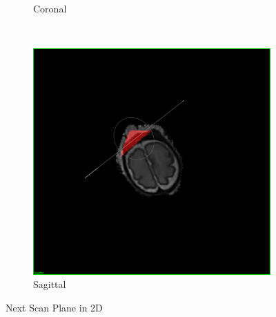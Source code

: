 \begin{figure}[H]
\begin{subfigure}[b]{0.4\textwidth}
    \caption*{Coronal}
    \label{fig:nextscanplanecoronal}
  \end{subfigure}
  ~%
  \begin{subfigure}[b]{0.4\textwidth}
    \includegraphics[width=\textwidth]{images/next_scan_plane/sagittal.png}
    \caption*{Sagittal}
    \label{fig:nextscanplanesagittal}
  \end{subfigure}
  \caption{Next Scan Plane in 2D}\label{fig:nextscanplane2d}
\end{figure}